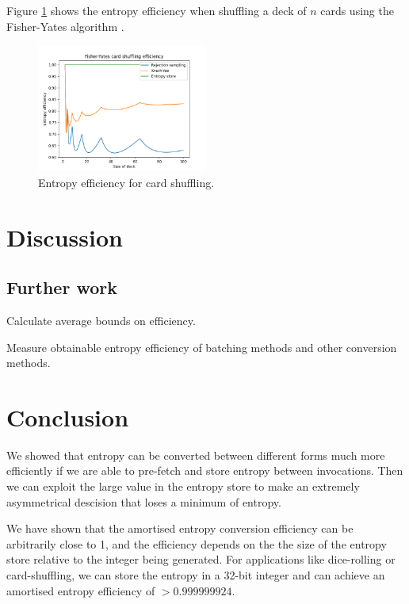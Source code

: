 \documentclass[12pt]{article}
\begin{document}
Figure \ref{fig:shuffle} shows the entropy efficiency when shuffling a deck of $n$ cards using the Fisher-Yates algorithm \cite{fisher-yates}.

\begin{figure}[ht]
\centering
\includegraphics[width=0.5\textwidth]{shuffling_efficiency.png}
\caption{Entropy efficiency for card shuffling.}
\label{fig:shuffle}
\end{figure}






\section{Discussion}


\subsection{Further work}

Calculate average bounds on efficiency.

Measure obtainable entropy efficiency of batching methods and other conversion methods.


\section{Conclusion}

We showed that entropy can be converted between different forms much more efficiently if we are able to pre-fetch and store entropy between invocations. Then we can exploit the large value in the entropy store to make an extremely asymmetrical descision that loses a minimum of entropy.

We have shown that the amortised entropy conversion efficiency can be arbitrarily close to 1, and the efficiency depends on the the size of the entropy store relative to the integer being generated. For applications like dice-rolling or card-shuffling, we can store the entropy in a 32-bit integer and can achieve an amortised entropy efficiency of $> 0.999999924$.
\end{document}
